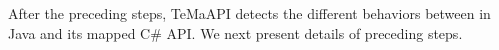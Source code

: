 After the preceding steps, TeMaAPI detects the different behaviors between  in Java and its mapped C\# API. 
We next present details of preceding steps.




%
%
%
%
%
%
